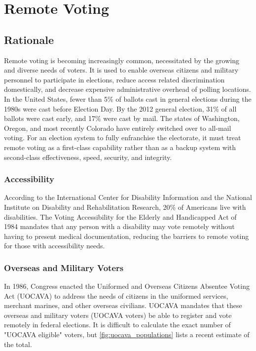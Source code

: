 \chapter{Remote Voting}
\label{chapter:remote_voting}

\section{Rationale}
Remote voting is becoming increasingly common, necessitated by the growing
and diverse needs of voters. It is used to enable overseas
citizens and military personnel to participate in elections, reduce
access related discrimination domestically, and decrease expensive
administrative overhead of polling locations. In the United States,
fewer than 5\% of ballots cast in general elections during the 1980s
were cast before Election Day. By the 2012 general election, 31\% of
all ballots were cast early, and 17\% were cast by mail. The states of
Washington, Oregon, and most recently Colorado have entirely switched
over to all-mail voting. For an election system to fully enfranchise the
electorate, it must treat remote voting as a first-class capability
rather than as a backup system with second-class effectiveness, speed,
security, and integrity.

\subsection{Accessibility}
According to the International Center for Disability Information and
the National Institute on Disability and Rehabilitation Research, 20\%
of Americans live with disabilities. The Voting Accessibility for the
Elderly and Handicapped Act of 1984 mandates that any person with a
disability may vote remotely without having to present medical
documentation, reducing the barriers to remote voting for those with
accessibility needs.


\subsection{Overseas and Military Voters}
In 1986, Congress enacted the Uniformed and Overseas Citizens Absentee
Voting Act (UOCAVA) to address the needs of citizens in the uniformed
services, merchant marines, and other overseas civilians. UOCAVA
mandates that these overseas and military voters (UOCAVA voters) be able to register and vote remotely in
federal elections. It is difficult to calculate the exact number of
"UOCAVA eligible" voters, but \autoref{fig:uocava_populations} lists a
recent estimate of the total.

